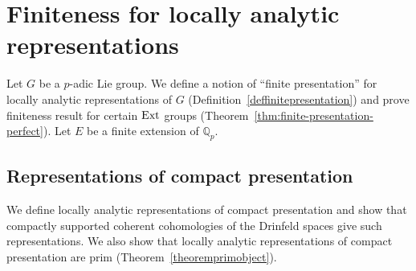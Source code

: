 \documentclass[a4paper,10pt]{amsart}
\theoremstyle{remark}
\theoremstyle{definition}
\theoremstyle{plain}
\numberwithin{equation}{section}
\newcommand{\bbQ}{{\mathbb Q}}
\newcommand{\Ext}{{\rm Ext}}
\begin{document}
\section{Finiteness for locally analytic representations}\label{sectionfintiepresentation}
Let $G$ be a $p$-adic Lie group. We define a notion of ``finite presentation'' for locally analytic representations of $G$ (Definition~\ref{deffinitepresentation}) and prove finiteness result for certain $\Ext$ groups (Theorem~\ref{thm:finite-presentation-perfect}). Let $E$ be a finite extension of $\bbQ_p$.
\subsection{Representations of compact presentation}
We define locally analytic representations of compact presentation and show that compactly supported coherent cohomologies of the Drinfeld spaces give such representations. We also show that locally analytic representations of compact presentation are prim (Theorem~\ref{theoremprimobject}).
\end{document}
